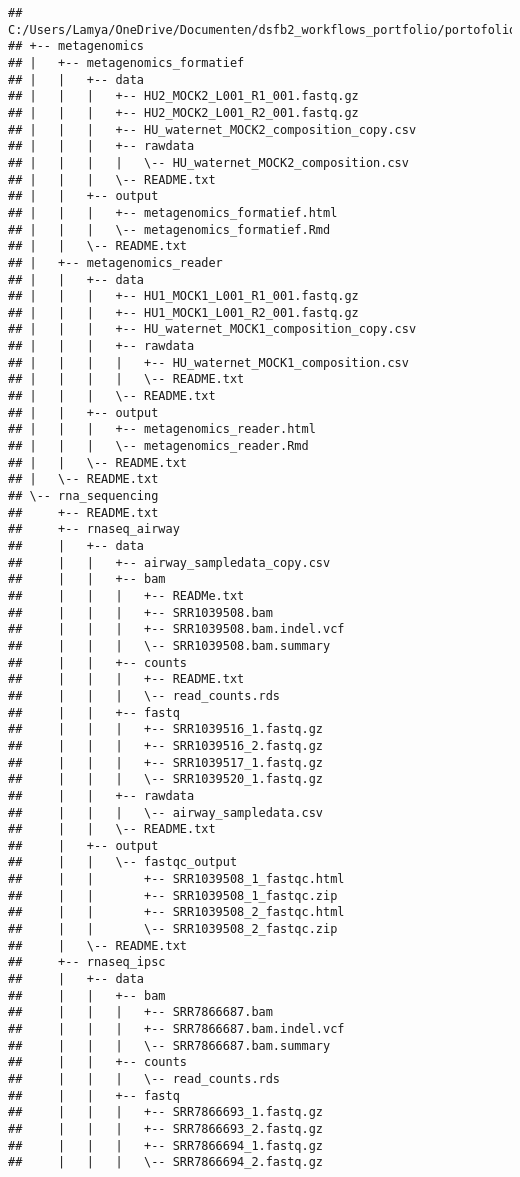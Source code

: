\documentclass[
]{book}
\begin{document}
\begin{verbatim}
## C:/Users/Lamya/OneDrive/Documenten/dsfb2_workflows_portfolio/portofolio_bookdown/Guerrila_structure
## +-- metagenomics
## |   +-- metagenomics_formatief
## |   |   +-- data
## |   |   |   +-- HU2_MOCK2_L001_R1_001.fastq.gz
## |   |   |   +-- HU2_MOCK2_L001_R2_001.fastq.gz
## |   |   |   +-- HU_waternet_MOCK2_composition_copy.csv
## |   |   |   +-- rawdata
## |   |   |   |   \-- HU_waternet_MOCK2_composition.csv
## |   |   |   \-- README.txt
## |   |   +-- output
## |   |   |   +-- metagenomics_formatief.html
## |   |   |   \-- metagenomics_formatief.Rmd
## |   |   \-- README.txt
## |   +-- metagenomics_reader
## |   |   +-- data
## |   |   |   +-- HU1_MOCK1_L001_R1_001.fastq.gz
## |   |   |   +-- HU1_MOCK1_L001_R2_001.fastq.gz
## |   |   |   +-- HU_waternet_MOCK1_composition_copy.csv
## |   |   |   +-- rawdata
## |   |   |   |   +-- HU_waternet_MOCK1_composition.csv
## |   |   |   |   \-- README.txt
## |   |   |   \-- README.txt
## |   |   +-- output
## |   |   |   +-- metagenomics_reader.html
## |   |   |   \-- metagenomics_reader.Rmd
## |   |   \-- README.txt
## |   \-- README.txt
## \-- rna_sequencing
##     +-- README.txt
##     +-- rnaseq_airway
##     |   +-- data
##     |   |   +-- airway_sampledata_copy.csv
##     |   |   +-- bam
##     |   |   |   +-- READMe.txt
##     |   |   |   +-- SRR1039508.bam
##     |   |   |   +-- SRR1039508.bam.indel.vcf
##     |   |   |   \-- SRR1039508.bam.summary
##     |   |   +-- counts
##     |   |   |   +-- README.txt
##     |   |   |   \-- read_counts.rds
##     |   |   +-- fastq
##     |   |   |   +-- SRR1039516_1.fastq.gz
##     |   |   |   +-- SRR1039516_2.fastq.gz
##     |   |   |   +-- SRR1039517_1.fastq.gz
##     |   |   |   \-- SRR1039520_1.fastq.gz
##     |   |   +-- rawdata
##     |   |   |   \-- airway_sampledata.csv
##     |   |   \-- README.txt
##     |   +-- output
##     |   |   \-- fastqc_output
##     |   |       +-- SRR1039508_1_fastqc.html
##     |   |       +-- SRR1039508_1_fastqc.zip
##     |   |       +-- SRR1039508_2_fastqc.html
##     |   |       \-- SRR1039508_2_fastqc.zip
##     |   \-- README.txt
##     +-- rnaseq_ipsc
##     |   +-- data
##     |   |   +-- bam
##     |   |   |   +-- SRR7866687.bam
##     |   |   |   +-- SRR7866687.bam.indel.vcf
##     |   |   |   \-- SRR7866687.bam.summary
##     |   |   +-- counts
##     |   |   |   \-- read_counts.rds
##     |   |   +-- fastq
##     |   |   |   +-- SRR7866693_1.fastq.gz
##     |   |   |   +-- SRR7866693_2.fastq.gz
##     |   |   |   +-- SRR7866694_1.fastq.gz
##     |   |   |   \-- SRR7866694_2.fastq.gz

\end{verbatim}
\end{document}
